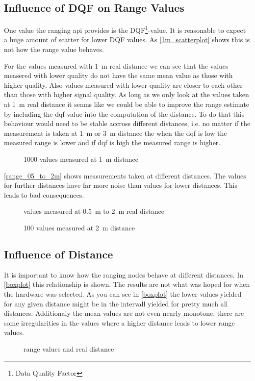 \subsection{Influence of DQF on Range Values}
One value the ranging api provides is the DQF\footnote{Data Quality Factor}-value.
It is reasonable to expect a huge amount of scatter for lower DQF values.
As \autoref{1m_scatterplot} shows this is not how the range value behaves.

For the values measured with \SI{1}{\metre} real distance we can see that the values measered with lower quality do not have the same mean value as those with higher quality.
Also values measured with lower quality are closer to each other than those with higher signal quality.
As long as we only look at the values taken at \SI{1}{\metre} real distance it seams like we could be able to improve the range estimate by including the dqf value into the computation of the distance.
To do that this behaviour would need to be stable accross different distances, i.e. no matter if the measurement is taken at \SI{1}{\metre} or \SI{3}{\metre} distance the when the dqf is low the measured range is lower and if dqf is high the measured range is higher.
\begin{figure}[H]
	\centering
	
	\caption{1000 values measured at \SI{1}{\metre} distance}
	\label{1m_scatterplot}
\end{figure}

\autoref{range_05_to_2m} shows measurements taken at different distances.
The values for further distances have far more noise than values for lower distances.
This leads to bad consequences.
\begin{figure}[H]
	\centering
	
	\caption{values measured at \SI{0.5}{\metre} to \SI{2}{\metre} real distance}
	\label{range_05_to_2m}
\end{figure}

\begin{figure}[H]
	\centering
	
	\caption{100 values measured at \SI{2}{\metre} distance}
	\label{2m}
\end{figure}

\subsection{Influence of Distance}

It is important to know how the ranging nodes behave at different distances.
In \autoref{boxplot} this relationship is shown.
The results are not what was hoped for when the hardware was selected.
As you can see in \autoref{boxplot} the lower values yielded for any given distance might be in the intervall yielded for pretty much all distances.
Additionaly the mean values are not even nearly monotone, there are some irregularities in the values where a higher distance leads to lower range values.
\begin{landscape}
	\begin{figure}[H]
		\centering
		
		\caption{range values and real distance}
		\label{boxplot}
	\end{figure}
\end{landscape}

